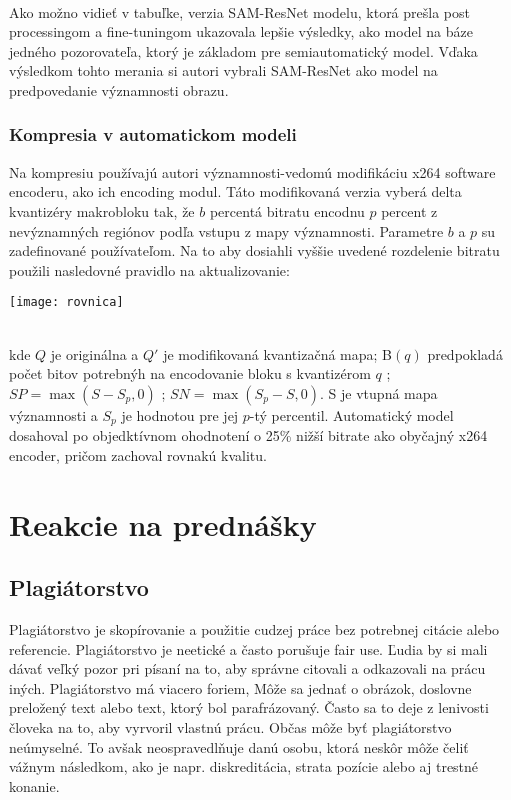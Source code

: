 \documentclass[10pt,twoside,slovak,a4paper]{article}
\begin{document}
\\
Ako možno vidieť v tabuľke, verzia SAM-ResNet modelu, ktorá prešla post processingom a fine-tuningom ukazovala lepšie výsledky, ako model na báze jedného pozorovateľa, ktorý je základom pre semiautomatický model. Vďaka výsledkom tohto merania si autori\cite{Czarnecki:Progress} vybrali SAM-ResNet ako model na predpovedanie významnosti obrazu.

\subsubsection{Kompresia v automatickom modeli}
Na kompresiu používajú autori\cite{Czarnecki:Progress} významnosti-vedomú modifikáciu x264 software encoderu, ako ich encoding modul. Táto modifikovaná verzia vyberá delta kvantizéry makrobloku tak, že \(b\) percentá bitratu encodnu \(p\) percent z nevýznamných regiónov podľa vstupu z mapy významnosti. Parametre \(b\) a \(p\) su zadefinované používateľom. Na to aby dosiahli vyššie uvedené rozdelenie bitratu použili nasledovné pravidlo na aktualizovanie:
\begin{figure*}[tbh]
\centering
\texttt{[image: rovnica]}
\label{f:rovnica}
\end{figure*}
\\
kde \(Q\) je originálna a \({Q}'\) je modifikovaná kvantizačná mapa; B\((q)\) predpokladá počet bitov potrebnýh na encodovanie bloku s kvantizérom \(q\) ; \(SP = \max(S - S_{p}, 0)\) ; \(SN = \max(S_{p} - S, 0)\). S je vtupná mapa významnosti a \(S_{p}\) je hodnotou pre jej \(p\)-tý percentil. Automatický model dosahoval po objedktívnom ohodnotení o 25\% nižší bitrate ako obyčajný x264 encoder, pričom zachoval rovnakú kvalitu. 

\section{Reakcie na prednášky}

\subsection{Plagiátorstvo}
Plagiátorstvo je skopírovanie a použitie cudzej práce bez potrebnej citácie alebo referencie. Plagiátorstvo je neetické a často porušuje fair use. Ľudia by si mali dávať veľký pozor pri písaní na to, aby správne citovali a odkazovali na prácu iných. Plagiátorstvo má viacero foriem, Môže sa jednať o obrázok, doslovne preložený text alebo text, ktorý bol parafrázovaný. Často sa to deje z lenivosti človeka na to, aby vyrvoril vlastnú prácu. Občas môže byť plagiátorstvo  neúmyselné. To avšak neospravedlňuje danú osobu, ktorá neskôr môže čeliť vážnym následkom, ako je napr. diskreditácia, strata pozície alebo aj trestné konanie.
\end{document}
